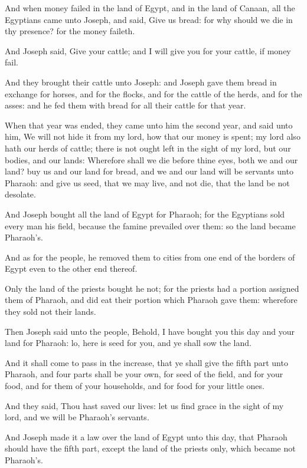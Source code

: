 \verse And when money failed in the land of Egypt, and in the land of Canaan, all the Egyptians came unto Joseph, and said, Give us bread: for why should we die in thy presence? for the money faileth.

\verse And Joseph said, Give your cattle; and I will give you for your cattle, if money fail.

\verse And they brought their cattle unto Joseph: and Joseph gave them bread in exchange for horses, and for the flocks, and for the cattle of the herds, and for the asses: and he fed them with bread for all their cattle for that year.

\verse When that year was ended, they came unto him the second year, and said unto him, We will not hide it from my lord, how that our money is spent; my lord also hath our herds of cattle; there is not ought left in the sight of my lord, but our bodies, and our lands: \verse Wherefore shall we die before thine eyes, both we and our land?  buy us and our land for bread, and we and our land will be servants unto Pharaoh: and give us seed, that we may live, and not die, that the land be not desolate.

\verse And Joseph bought all the land of Egypt for Pharaoh; for the Egyptians sold every man his field, because the famine prevailed over them: so the land became Pharaoh's.

\verse And as for the people, he removed them to cities from one end of the borders of Egypt even to the other end thereof.

\verse Only the land of the priests bought he not; for the priests had a portion assigned them of Pharaoh, and did eat their portion which Pharaoh gave them: wherefore they sold not their lands.

\verse Then Joseph said unto the people, Behold, I have bought you this day and your land for Pharaoh: lo, here is seed for you, and ye shall sow the land.

\verse And it shall come to pass in the increase, that ye shall give the fifth part unto Pharaoh, and four parts shall be your own, for seed of the field, and for your food, and for them of your households, and for food for your little ones.

\verse And they said, Thou hast saved our lives: let us find grace in the sight of my lord, and we will be Pharaoh's servants.

\verse And Joseph made it a law over the land of Egypt unto this day, that Pharaoh should have the fifth part, except the land of the priests only, which became not Pharaoh's.

